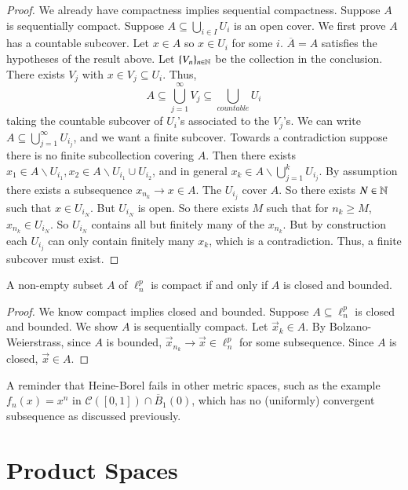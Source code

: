 \begin{proof}
    We already have compactness implies sequential compactness. Suppose $A$ is sequentially compact. Suppose $A \subseteq \bigcup_{i\in I}U_i$ is an open cover. We first prove $A$ has a countable subcover. Let $x \in A$ so $x \in U_i$ for some $i$. $\overline{A} = A$ satisfies the hypotheses of the result above. Let $\{V_n\}_{n \in \mathbb N}$ be the collection in the conclusion. There exists $V_j$ with $x \in V_j \subseteq U_i$. Thus, $$A \subseteq \bigcup_{j=1}^{\infty}V_j \subseteq \bigcup_{countable}U_i$$ taking the countable subcover of $U_i$'s associated to the $V_j$'s. We can write $A \subseteq \bigcup_{j=1}^{\infty}U_{i_j}$, and we want a finite subcover. Towards a contradiction suppose there is no finite subcollection covering $A$. Then there exists $x_1 \in A\backslash U_{i_1}, x_2 \in A\backslash U_{i_1}\cup U_{i_2}$, and in general $x_k \in A \backslash \bigcup_{j=1}^kU_{i_j}$. By assumption there exists a subsequence $x_{n_k}\rightarrow x \in A$. The $U_{i_j}$ cover $A$. So there exists $N \in \mathbb N$ such that $x \in U_{i_N}$. But $U_{i_N}$ is open. So there exists $M$ such that for $n_k \geq M$, $x_{n_k} \in U_{i_N}$. So $U_{i_N}$ contains all but finitely many of the $x_{n_k}$. But by construction each $U_{i_j}$ can only contain finitely many $x_k$, which is a contradiction. Thus, a finite subcover must exist.
\end{proof}

\begin{thm}
    A non-empty subset $A$ of $\ell_n^p$ is compact if and only if $A$ is closed and bounded.
\end{thm}
\begin{proof}
    We know compact implies closed and bounded. Suppose $A \subseteq \ell_n^p$ is closed and bounded. We show $A$ is sequentially compact. Let $\vec{x}_k \in A$. By Bolzano-Weierstrass, since $A$ is bounded, $\vec{x}_{n_k} \rightarrow \vec{x} \in \ell_n^p$ for some subsequence. Since $A$ is closed, $\vec{x} \in A$.
\end{proof}

A reminder that Heine-Borel fails in other metric spaces, such as the example $f_n(x) = x^n$ in $\mathcal{C}([0,1])\cap \overline{B}_1(0)$, which has no (uniformly) convergent subsequence as discussed previously.



\section{Product Spaces}


